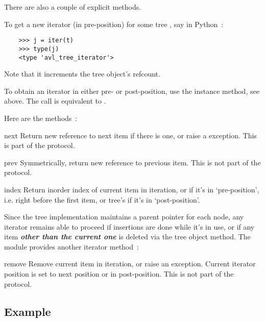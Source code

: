 \documentclass{howto}
\begin{document}
There are also a couple of explicit methods.

To get a new iterator (in pre-position) for some tree , say
 in Python~:
\begin{Verbatim}
	>>> j = iter(t)
	>>> type(j)
	<type 'avl_tree_iterator'>
\end{Verbatim}
Note that it increments the tree object's refcount.

To obtain an iterator in either pre- or post-position,
use the  instance method, see above.
The call  is equivalent to .

Here are the methods~:

\begin{methoddesc}{next}{}
	Return new reference to next item if there is one, or raise
	a   exception. This is part of the protocol.
\end{methoddesc}

\begin{methoddesc}{prev}{}
	Symmetrically, return new reference to previous item.
	This is not part of the protocol.
\end{methoddesc}

\begin{methoddesc}{index}{}
	Return inorder index of current item in iteration, 
	or  if it's in `pre-position', i.e. right before the
	first item, or tree's  if it's in `post-position'.
\end{methoddesc}

Since the tree implementation maintains a parent pointer for each
node, any iterator remains able to proceed if insertions are done
while it's in use, or if any item \emph{\textbf{other than the current
one}} is deleted via the  tree object method.  The
module provides another iterator method~:

\begin{methoddesc}{remove}{}
	Remove current item in iteration, or raise an
	 exception.  Current iterator position is set
	to next position or in post-position. This is not part of the protocol.
\end{methoddesc}

\subsection{Example \label{avl-example}}
\end{document}
